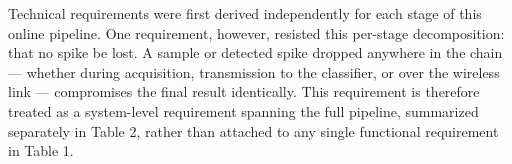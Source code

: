 \documentclass[11pt]{article}
\begin{document}
Technical requirements were first derived independently for each stage of
this online pipeline. One requirement, however, resisted this per-stage
decomposition: that no spike be lost. A sample or detected spike dropped
anywhere in the chain --- whether during acquisition, transmission to the
classifier, or over the wireless link --- compromises the final result
identically. This requirement is therefore treated as a system-level
requirement spanning the full pipeline, summarized separately in Table 2,
rather than attached to any single functional requirement in Table 1.

\end{document}
